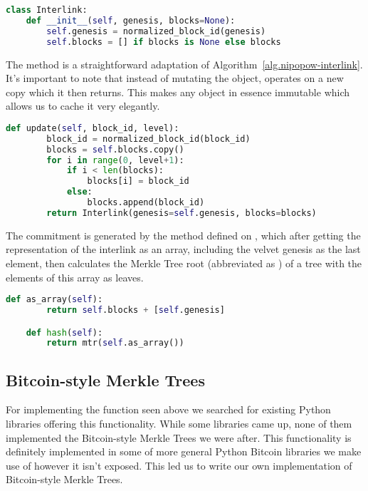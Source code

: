 \begin{lstlisting}[language=Python]
class Interlink:
    def __init__(self, genesis, blocks=None):
        self.genesis = normalized_block_id(genesis)
        self.blocks = [] if blocks is None else blocks
\end{lstlisting}

The  method is a straightforward adaptation of Algorithm~\ref{alg.nipopow-interlink}. It's important to note that instead of mutating the  object,  operates on a new copy which it then returns. This makes any  object in essence immutable which allows us to cache it very elegantly.

\begin{lstlisting}[language=Python]
    def update(self, block_id, level):
        block_id = normalized_block_id(block_id)
        blocks = self.blocks.copy()
        for i in range(0, level+1):
            if i < len(blocks):
                blocks[i] = block_id
            else:
                blocks.append(block_id)
        return Interlink(genesis=self.genesis, blocks=blocks)
\end{lstlisting}

The commitment is generated by the  method defined on , which after getting the representation of the interlink as an array, including the velvet genesis as the last element, then calculates the Merkle Tree root (abbreviated as ) of a tree with the elements of this array as leaves.

\begin{lstlisting}[language=Python]
    def as_array(self):
        return self.blocks + [self.genesis]

    def hash(self):
        return mtr(self.as_array())
\end{lstlisting}

\subsection{Bitcoin-style Merkle Trees}

For implementing the  function seen above we searched for existing Python libraries offering this functionality. While some libraries came up, none of them implemented the Bitcoin-style Merkle Trees we were after. This functionality is definitely implemented in some of more general Python Bitcoin libraries we make use of however it isn't exposed. This led us to write our own implementation of Bitcoin-style Merkle Trees.

